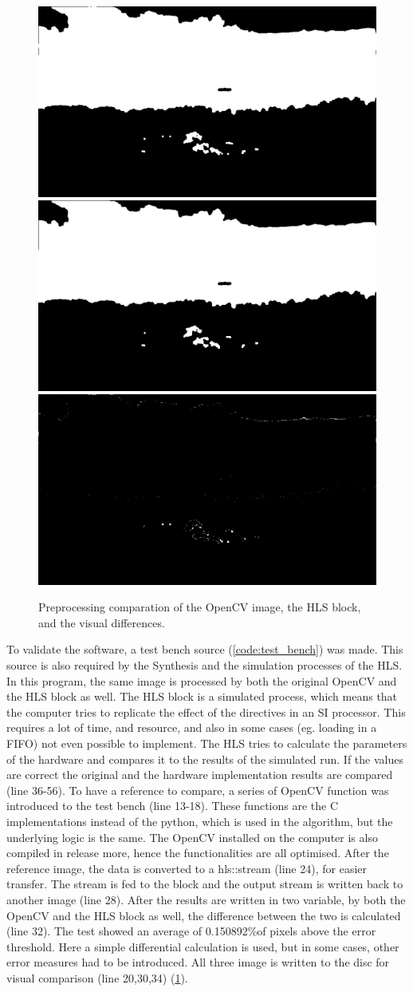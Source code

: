 \begin{figure}
    \centering
    \includegraphics[width=.32\linewidth]{images/preproc/out_ocv.jpg}
    \includegraphics[width=.32\linewidth]{images/preproc/hls_out.jpg}
    \includegraphics[width=.32\linewidth]{images/preproc/error.png}
    \caption{Preprocessing comparation of the OpenCV image, the HLS block, and the visual differences.}
    \label{fig:preproc_compare}
\end{figure}

To validate the software, a test bench source (\cref{code:test_bench}) was made.
This source is also required by the Synthesis and the simulation processes of the HLS.
In this program, the same image is processed by both the original OpenCV and the HLS block as well.
The HLS block is a simulated process, which means that the computer tries to replicate the effect of the directives in an SI processor.
This requires a lot of time, and resource, and also in some cases (eg. loading in a FIFO) not even possible to implement.
The HLS tries to calculate the parameters of the hardware and compares it to the results of the simulated run.
If the values are correct the original and the hardware implementation results are compared (line 36-56).
To have a reference to compare, a series of OpenCV function was introduced to the test bench (line 13-18).
These functions are the C implementations instead of the python, which is used in the algorithm, but the underlying logic is the same.
The OpenCV installed on the computer is also compiled in release more, hence the functionalities are all optimised.
After the reference image, the data is converted to a hls::stream (line 24), for easier transfer.
The stream is fed to the block and the output stream is written back to another image (line 28).
After the results are written in two variable, by both the OpenCV and the HLS block as well, the difference between the two is calculated (line 32).
The test showed an average of 0.150892\%of pixels above the error threshold.
Here a simple differential calculation is used, but in some cases, other error measures had to be introduced.
All three image is written to the disc for visual comparison (line 20,30,34) (\cref{fig:preproc_compare}).

